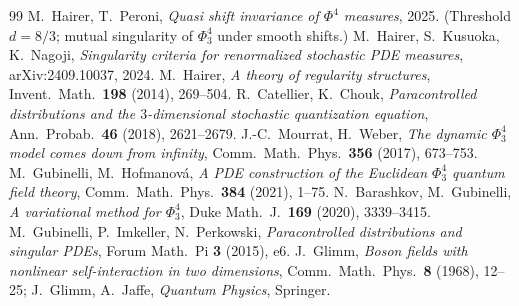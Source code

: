 \begin{thebibliography}{99}
 M.~Hairer, T.~Peroni, \emph{Quasi shift invariance of $\Phi^4$ measures}, 2025. (Threshold $d=8/3$; mutual singularity of $\Phi^4_3$ under smooth shifts.)
 M.~Hairer, S.~Kusuoka, K.~Nagoji, \emph{Singularity criteria for renormalized stochastic PDE measures}, arXiv:2409.10037, 2024.
 M.~Hairer, \emph{A theory of regularity structures}, Invent.\ Math.\ \textbf{198} (2014), 269--504.
 R.~Catellier, K.~Chouk, \emph{Paracontrolled distributions and the $3$-dimensional stochastic quantization equation}, Ann.\ Probab.\ \textbf{46} (2018), 2621--2679.
 J.-C.~Mourrat, H.~Weber, \emph{The dynamic $\Phi^4_3$ model comes down from infinity}, Comm.\ Math.\ Phys.\ \textbf{356} (2017), 673--753.
 M.~Gubinelli, M.~Hofmanov\'a, \emph{A PDE construction of the Euclidean $\Phi^4_3$ quantum field theory}, Comm.\ Math.\ Phys.\ \textbf{384} (2021), 1--75.
 N.~Barashkov, M.~Gubinelli, \emph{A variational method for $\Phi^4_3$}, Duke Math.\ J.\ \textbf{169} (2020), 3339--3415.
 M.~Gubinelli, P.~Imkeller, N.~Perkowski, \emph{Paracontrolled distributions and singular PDEs}, Forum Math.\ Pi \textbf{3} (2015), e6.
 J.~Glimm, \emph{Boson fields with nonlinear self-interaction in two dimensions}, Comm.\ Math.\ Phys.\ \textbf{8} (1968), 12--25; J.~Glimm, A.~Jaffe, \emph{Quantum Physics}, Springer.
\end{thebibliography}
\endgroup
